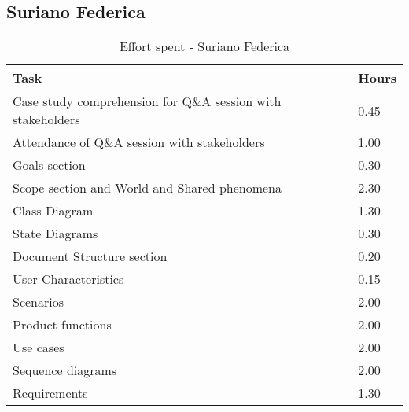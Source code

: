 \subsection{Suriano Federica}
\renewcommand{\arraystretch}{2}
\begin{longtable}{|m{9cm}|m{1.2cm}|}
\caption{Effort spent - Suriano Federica}\\
\hline
\endfirsthead
\endhead
\hline
\endlastfoot
\rowcolor{green2}
\textbf{Task} &\hfil {\textbf{Hours}}\\
\hline
Case study comprehension for Q\&A session with stakeholders & \hfil 0.45\\
Attendance of Q\&A session with stakeholders & \hfil 1.00\\
Goals section & \hfil 0.30\\
Scope section and World and Shared phenomena & \hfil 2.30\\
Class Diagram & \hfil 1.30\\
State Diagrams & \hfil 0.30\\
Document Structure section & \hfil 0.20\\
User Characteristics & \hfil 0.15\\
Scenarios  & \hfil 2.00\\
Product functions & \hfil 2.00\\
Use cases & \hfil 2.00\\
Sequence diagrams & \hfil 2.00\\
Requirements & \hfil 1.30\\
\hline
\end{longtable}
